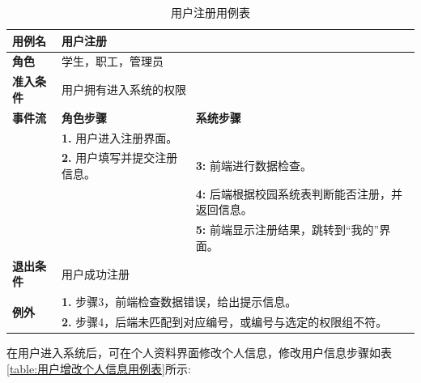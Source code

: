 \begin{table}[H]
  \centering
  \renewcommand\arraystretch{1.1}
  \small
  \caption{用户注册用例表}
  \label{table:用户注册用例表}
  \setlength{\tabcolsep}{4mm}
  \begin{tabular}{|p{2cm}|p{5.75cm}|p{5.75cm}|}
    \hline \textbf{用例名} & \multicolumn{2}{l|}{用户注册} \\
    \hline \textbf{角色} & \multicolumn{2}{l|}{学生，职工，管理员} \\
    \hline \textbf{准入条件} & \multicolumn{2}{l|}{用户拥有进入系统的权限} \\
    \hline \textbf{事件流} & \textbf{角色步骤} & \textbf{系统步骤} \\
    \hline \multirow{3}{*}{~} & \textbf{1.} 用户进入注册界面。  &    \\
    \cline{2-3} & \textbf{2.} 用户填写并提交注册信息。 & \textbf{3:} 前端进行数据检查。 \\
    \cline{2-3} &  & \textbf{4:} 后端根据校园系统表判断能否注册，并返回信息。 \\
    \cline{2-3} &  & \textbf{5:} 前端显示注册结果，跳转到``我的''界面。 \\
    \hline \textbf{退出条件}  & \multicolumn{2}{l|}{用户成功注册} \\
    \hline \multirow{2}{*}{\textbf{例外}} & \multicolumn{2}{l|}{\textbf{1.} 步骤3，前端检查数据错误，给出提示信息。} \\
     & \multicolumn{2}{l|}{\textbf{2.} 步骤4，后端未匹配到对应编号，或编号与选定的权限组不符。} \\
    \hline
  \end{tabular}
\end{table}

在用户进入系统后，可在个人资料界面修改个人信息，修改用户信息步骤如表\ref{table:用户增改个人信息用例表}所示:

